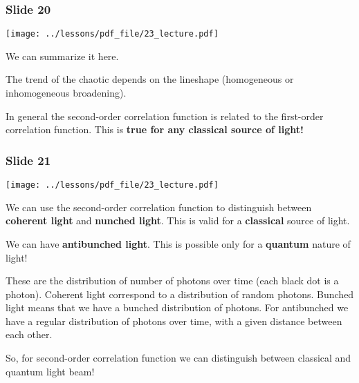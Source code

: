 \documentclass[../main/main.tex]{subfiles}
\begin{document}
\subsubsection*{Slide 20}

\begin{minipage}[]{0.5\linewidth}
\centering
\texttt{[image: ../lessons/pdf\_file/23\_lecture.pdf]}
\end{minipage}
\hspace{0.3cm}\vspace{0.3cm}
\begin{minipage}[c]{0.47\linewidth}

We can summarize it here.

The trend of the chaotic depends on the lineshape (homogeneous or inhomogeneous broadening).

In general the second-order correlation function is related to the first-order correlation function. This is \textbf{true for any classical source of light!}

\end{minipage}

\subsubsection*{Slide 21}

\begin{minipage}[]{0.5\linewidth}
\centering
\texttt{[image: ../lessons/pdf\_file/23\_lecture.pdf]}
\end{minipage}
\hspace{0.3cm}\vspace{0.3cm}
\begin{minipage}[c]{0.47\linewidth}

We can use the second-order correlation function to distinguish between \textbf{coherent light} and \textbf{nunched light}. This is valid for a \textbf{classical} source of light.

We can have \textbf{antibunched light}. This is possible only for a \textbf{quantum} nature of light!

These are the distribution of number of photons over time (each black dot is a photon). Coherent light correspond to a distribution of random photons.
Bunched light means that we have a bunched distribution of photons.
For antibunched we have a regular distribution of photons over time, with a given distance between each other.

So, for second-order correlation function we can distinguish between classical and quantum light beam!

\end{minipage}
\end{document}
